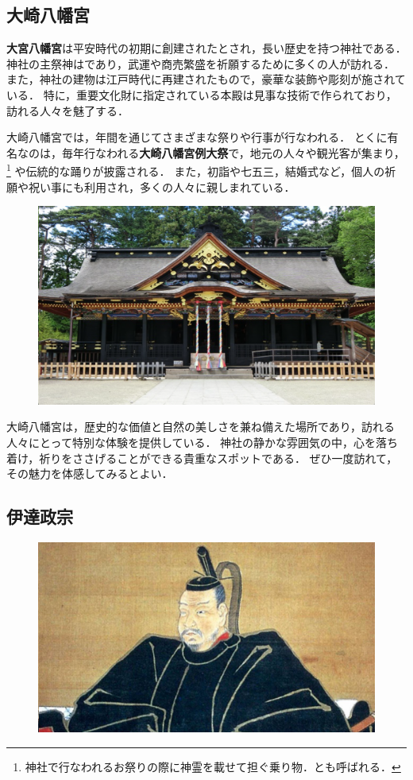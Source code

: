 \subsection*{大崎八幡宮}

\textbf{大宮八幡宮}は平安時代の初期に創建されたとされ，長い歴史を持つ神社である．
神社の主祭神はであり，武運や商売繁盛を祈願するために多くの人が訪れる．
また，神社の建物は江戸時代に再建されたもので，豪華な装飾や彫刻が施されている．
特に，重要文化財に指定されている本殿は見事な技術で作られており，訪れる人々を魅了する．

大崎八幡宮では，年間を通じてさまざまな祭りや行事が行なわれる．
とくに有名なのは，毎年行なわれる\textbf{大崎八幡宮例大祭}で，地元の人々や観光客が集まり，\footnote{神社で行なわれるお祭りの際に神霊を載せて担ぐ乗り物．とも呼ばれる．} や伝統的な踊りが披露される．
また，初詣や七五三，結婚式など，個人の祈願や祝い事にも利用され，多くの人々に親しまれている．
\begin{figure}[H]
	\centering
	\includegraphics[width=0.8\linewidth]{img/osakimachimangu}
	\label{fig:osakimachimangu}
\end{figure}

大崎八幡宮は，歴史的な価値と自然の美しさを兼ね備えた場所であり，訪れる人々にとって特別な体験を提供している．
神社の静かな雰囲気の中，心を落ち着け，祈りをささげることができる貴重なスポットである．
ぜひ一度訪れて，その魅力を体感してみるとよい．
\newpage

\subsection*{伊達政宗}

\begin{figure}[H]
	\centering
	\includegraphics[width=0.7\linewidth]{img/datemasamune}
	\label{fig:datemasamune}
\end{figure}


